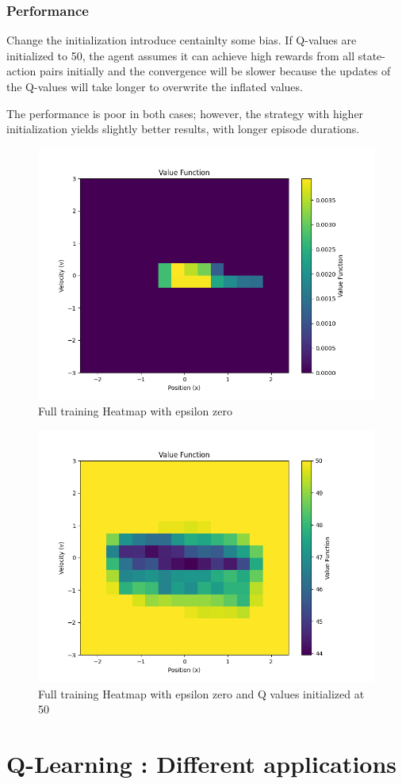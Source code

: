 \documentclass{article}
\begin{document}
\subsubsection{Performance}
Change the initialization introduce centainlty some bias.
If Q-values are initialized to 50, the agent assumes it can achieve high rewards from all state-action pairs initially and the convergence will be slower because the updates of the Q-values will take longer to overwrite the inflated values.

The performance is poor in both cases; however, the strategy with higher initialization yields slightly better results, with longer episode durations. 

\begin{figure}[h]
	\centering
	\includegraphics[width=0.5\linewidth]{../data/plot/heatmap_full_training_zero_epsilon.png}
	\caption{Full training Heatmap with epsilon zero}
	\label{fig:heatmap_zero}
\end{figure}

\begin{figure}[h]
	\centering
	\includegraphics[width=0.5\linewidth]{../data/plot/heatmap_full_training_zero_epsilon_fifty_initial.png}
	\caption{Full training Heatmap with epsilon zero and Q values initialized at 50}
	\label{fig:heatmap_zero}
\end{figure}

\newpage

\section{Q-Learning : Different applications}
\end{document}
